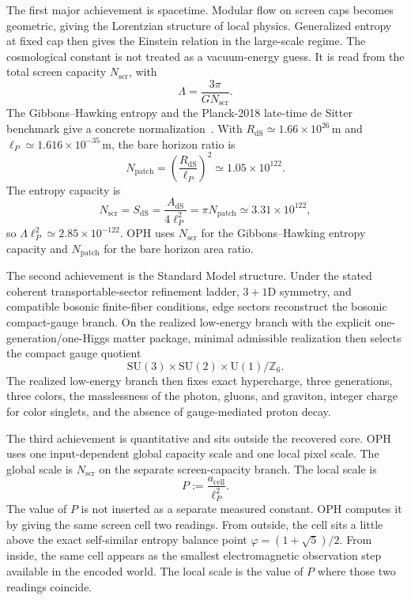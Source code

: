 \documentclass[11pt]{article}
\newcommand{\SU}{\mathrm{SU}}
\newcommand{\U}{\mathrm{U}}
\begin{document}
The first major achievement is spacetime. Modular flow on screen caps becomes geometric, giving the
Lorentzian structure of local physics. Generalized entropy at fixed cap then gives the Einstein
relation in the large-scale regime. The cosmological constant is not treated as a vacuum-energy
guess. It is read from the total screen capacity \(N_{\mathrm{scr}}\), with
\[
\Lambda=\frac{3\pi}{G N_{\mathrm{scr}}}.
\]
The Gibbons--Hawking entropy and the Planck-2018 late-time de Sitter benchmark give a concrete normalization~\cite{gibbonsHawking77,planck18}. With
\(R_{\mathrm{dS}}\simeq1.66\times10^{26}\,\mathrm m\) and
\(\ell_P\simeq1.616\times10^{-35}\,\mathrm m\), the bare horizon ratio is
\[
N_{\mathrm{patch}}=\left(\frac{R_{\mathrm{dS}}}{\ell_P}\right)^2\simeq1.05\times10^{122}.
\]
The entropy capacity is
\[
N_{\mathrm{scr}}=S_{\mathrm{dS}}=\frac{A_{\mathrm{dS}}}{4\ell_P^2}
=\pi N_{\mathrm{patch}}\simeq3.31\times10^{122},
\]
so \(\Lambda\ell_P^2\simeq2.85\times10^{-122}\). OPH uses \(N_{\mathrm{scr}}\) for the
Gibbons--Hawking entropy capacity and \(N_{\mathrm{patch}}\) for the bare horizon area ratio.

The second achievement is the Standard Model structure. Under the stated
coherent transportable-sector refinement ladder, \(3+1\)D symmetry, and compatible bosonic finite-fiber conditions, edge sectors reconstruct the
bosonic compact-gauge branch. On the realized low-energy branch with the explicit
one-generation/one-Higgs matter package, minimal admissible realization then selects the
compact gauge quotient
\[
\SU(3)\times\SU(2)\times\U(1)/\mathbb Z_6.
\]
The realized low-energy branch then fixes exact hypercharge, three generations, three colors, the
masslessness of the photon, gluons, and graviton, integer charge for color singlets, and the absence
of gauge-mediated proton decay.

The third achievement is quantitative and sits outside the recovered core. OPH uses one
input-dependent global capacity scale and one local pixel scale. The global scale is
\(N_{\mathrm{scr}}\) on the separate screen-capacity branch. The local scale is
\[
P:=\frac{a_{\mathrm{cell}}}{\ell_P^2}.
\]
The value of \(P\) is not inserted as a separate measured constant. OPH computes it by giving the
same screen cell two readings. From outside, the cell sits a little above the exact self-similar
entropy balance point \(\varphi=(1+\sqrt5)/2\). From inside, the same cell appears as the smallest
electromagnetic observation step available in the encoded world. The local scale is the value of
\(P\) where those two readings coincide.
\end{document}
